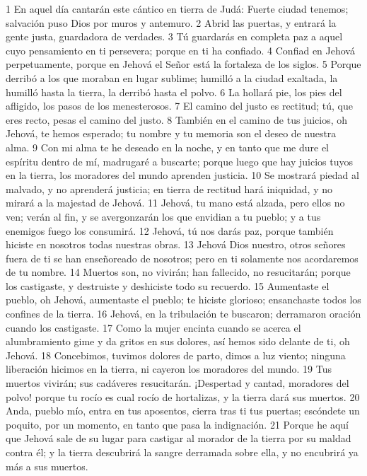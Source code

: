 1 En aquel día cantarán este cántico en tierra de Judá: Fuerte ciudad tenemos; salvación puso Dios por muros y antemuro.
2 Abrid las puertas, y entrará la gente justa, guardadora de verdades.
3 Tú guardarás en completa paz a aquel cuyo pensamiento en ti persevera; porque en ti ha confiado.
4 Confiad en Jehová perpetuamente, porque en Jehová el Señor está la fortaleza de los siglos.
5 Porque derribó a los que moraban en lugar sublime; humilló a la ciudad exaltada, la humilló hasta la tierra, la derribó hasta el polvo.
6 La hollará pie, los pies del afligido, los pasos de los menesterosos.
7 El camino del justo es rectitud; tú, que eres recto, pesas el camino del justo.
8 También en el camino de tus juicios, oh Jehová, te hemos esperado; tu nombre y tu memoria son el deseo de nuestra alma.
9 Con mi alma te he deseado en la noche, y en tanto que me dure el espíritu dentro de mí, madrugaré a buscarte; porque luego que hay juicios tuyos en la tierra, los moradores del mundo aprenden justicia.
10 Se mostrará piedad al malvado, y no aprenderá justicia; en tierra de rectitud hará iniquidad, y no mirará a la majestad de Jehová.
11 Jehová, tu mano está alzada, pero ellos no ven; verán al fin, y se avergonzarán los que envidian a tu pueblo; y a tus enemigos fuego los consumirá. 
12 Jehová, tú nos darás paz, porque también hiciste en nosotros todas nuestras obras.
13 Jehová Dios nuestro, otros señores fuera de ti se han enseñoreado de nosotros; pero en ti solamente nos acordaremos de tu nombre.
14 Muertos son, no vivirán; han fallecido, no resucitarán; porque los castigaste, y destruiste y deshiciste todo su recuerdo.
15 Aumentaste el pueblo, oh Jehová, aumentaste el pueblo; te hiciste glorioso; ensanchaste todos los confines de la tierra.
16 Jehová, en la tribulación te buscaron; derramaron oración cuando los castigaste.
17 Como la mujer encinta cuando se acerca el alumbramiento gime y da gritos en sus dolores, así hemos sido delante de ti, oh Jehová.
18 Concebimos, tuvimos dolores de parto, dimos a luz viento; ninguna liberación hicimos en la tierra, ni cayeron los moradores del mundo.
19 Tus muertos vivirán; sus cadáveres resucitarán. ¡Despertad y cantad, moradores del polvo! porque tu rocío es cual rocío de hortalizas, y la tierra dará sus muertos.
20 Anda, pueblo mío, entra en tus aposentos, cierra tras ti tus puertas; escóndete un poquito, por un momento, en tanto que pasa la indignación.
21 Porque he aquí que Jehová sale de su lugar para castigar al morador de la tierra por su maldad contra él; y la tierra descubrirá la sangre derramada sobre ella, y no encubrirá ya más a sus muertos.

